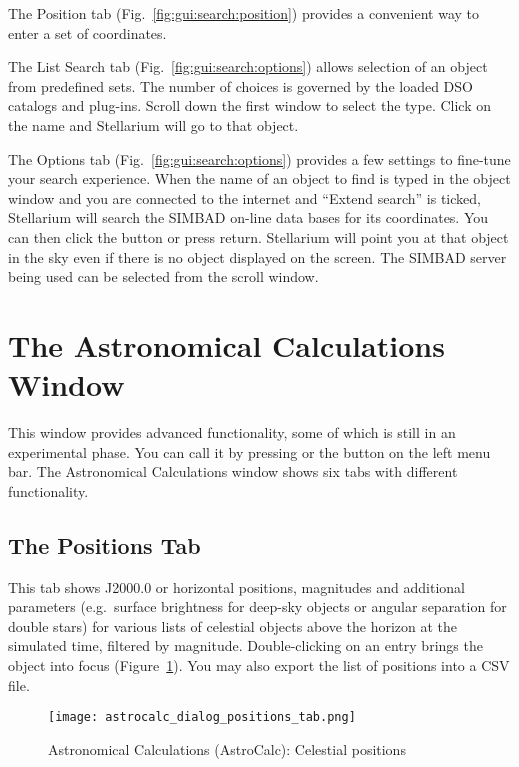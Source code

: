The Position tab (Fig.~\ref{fig:gui:search:position}) provides a convenient way to enter a set
of coordinates.

The List Search tab (Fig.~\ref{fig:gui:search:options}) allows selection of an object from predefined
sets.  The number of choices is governed by the loaded DSO catalogs and plug-ins. 
Scroll down the first window to select the type. Click on the name
and Stellarium will go to that object.

The Options tab (Fig.~\ref{fig:gui:search:options}) provides a few settings to fine-tune your search experience.
When the name of an object to find is typed in the object
window and you are connected to the internet and ``Extend search'' is
ticked, Stellarium will search the SIMBAD on-line  data bases for its
coordinates. You can then click the  button or press return.
Stellarium will point you at that object in the sky even if there is no
object displayed on the screen. The SIMBAD server being used can be
selected from the scroll window.


\section{The Astronomical Calculations Window}
\label{sec:gui:AstroCalc}

 This window provides advanced functionality, some of which is still in an experimental phase. 
You can call it by pressing  or the button  on the left menu bar. 
The Astronomical Calculations window shows six tabs with different functionality.

\subsection{The Positions Tab}
\label{sec:gui:AstroCalc:Positions}

 This tab shows J2000.0 or horizontal positions, magnitudes and additional parameters 
(e.g.\ surface brightness for deep-sky objects or angular separation for double stars) for various 
lists of celestial objects above the horizon at the simulated time, filtered by magnitude. 
Double-clicking on an entry brings the object into focus (Figure~\ref{fig:gui:AstroCalc:Positions}). 
You may also export the list of positions into a CSV file.


\begin{figure}[htbp]
\centering\texttt{[image: astrocalc\_dialog\_positions\_tab.png]}
\caption{Astronomical Calculations (AstroCalc): Celestial positions}
\label{fig:gui:AstroCalc:Positions}
\end{figure}

